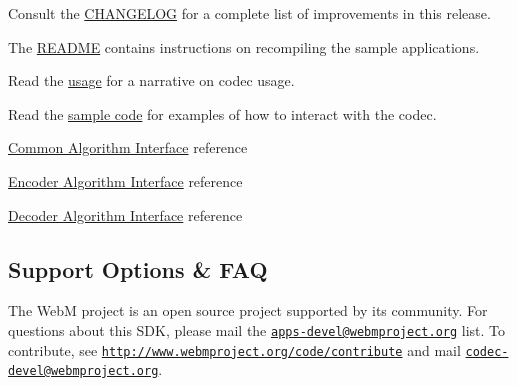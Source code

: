 \begin{DoxyItemize}
\item Consult the \hyperlink{changelog}{C\+H\+A\+N\+G\+E\+L\+O\+G} for a complete list of improvements in this release.
\item The \hyperlink{readme}{R\+E\+A\+D\+M\+E} contains instructions on recompiling the sample applications.
\item Read the \hyperlink{usage}{usage} for a narrative on codec usage.
\item Read the \hyperlink{samples}{sample code} for examples of how to interact with the codec.
\item \hyperlink{group__codec}{Common Algorithm Interface} reference
\begin{DoxyItemize}
\item \hyperlink{group__encoder}{Encoder Algorithm Interface} reference
\begin{DoxyItemize}
\item \hyperlink{group__decoder}{Decoder Algorithm Interface} reference
\end{DoxyItemize}
\end{DoxyItemize}
\end{DoxyItemize}\hypertarget{index_main_support}{}\subsection{Support Options \& F\+A\+Q}\label{index_main_support}
The Web\+M project is an open source project supported by its community. For questions about this S\+D\+K, please mail the \href{mailto:apps-devel@webmproject.org}{\tt apps-\/devel@webmproject.\+org} list. To contribute, see \href{http://www.webmproject.org/code/contribute}{\tt http\+://www.\+webmproject.\+org/code/contribute} and mail \href{mailto:codec-devel@webmproject.org}{\tt codec-\/devel@webmproject.\+org}. 
